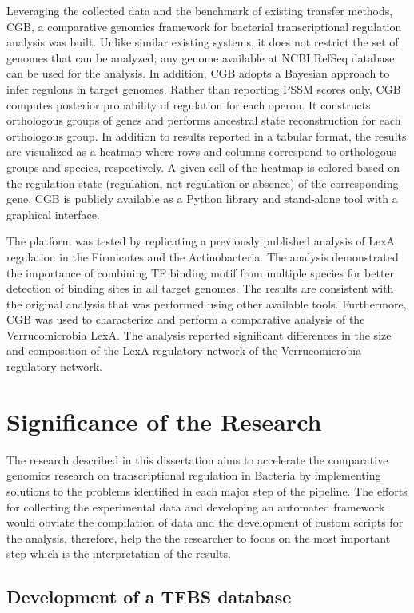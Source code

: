 \documentclass[12pt]{article}
\begin{document}
Leveraging the collected data and the benchmark of existing transfer methods,
CGB, a comparative genomics framework for bacterial transcriptional regulation
analysis was built. Unlike similar existing systems, it does not restrict the
set of genomes that can be analyzed; any genome available at NCBI RefSeq
database can be used for the analysis. In addition, CGB adopts a Bayesian
approach to infer regulons in target genomes. Rather than reporting PSSM scores
only, CGB computes posterior probability of regulation for each operon. It
constructs orthologous groups of genes and performs ancestral state
reconstruction for each orthologous group. In addition to results reported in a
tabular format, the results are visualized as a heatmap where rows and columns
correspond to orthologous groups and species, respectively. A given cell of the
heatmap is colored based on the regulation state (regulation, not regulation or
absence) of the corresponding gene. CGB is publicly available as a Python
library and stand-alone tool with a graphical interface.

The platform was tested by replicating a previously published analysis of LexA
regulation in the Firmicutes and the Actinobacteria. The analysis demonstrated the
importance of combining TF binding motif from multiple species for better
detection of binding sites in all target genomes. The results are consistent
with the original analysis that was performed using other available
tools. Furthermore, CGB was used to characterize and perform a comparative analysis
of the Verrucomicrobia LexA. The analysis reported significant
differences in the size and composition of the LexA regulatory network of the
Verrucomicrobia regulatory network.

\section{Significance of the Research}

The research described in this dissertation aims to accelerate the comparative
genomics research on transcriptional regulation in Bacteria by implementing
solutions to the problems identified in each major step of the pipeline. The
efforts for collecting the experimental data and developing an automated
framework would obviate the compilation of data and the development of custom
scripts for the analysis, therefore, help the the researcher to focus on the
most important step which is the interpretation of the results.

\subsection{Development of a TFBS database}
\end{document}
